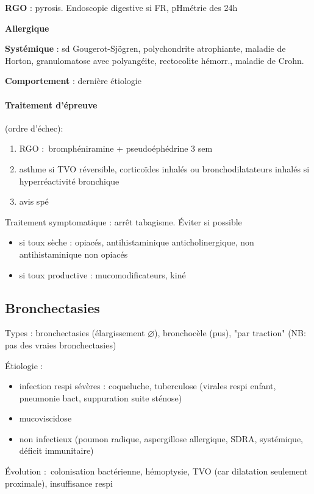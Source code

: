 \documentclass{article}
\begin{document}
\textbf{RGO} : pyrosis. Endoscopie digestive si FR, pHmétrie des 24h

\textbf{Allergique} 

\textbf{Systémique} : sd Gougerot-Sjögren, polychondrite atrophiante, maladie
de Horton, granulomatose avec polyangéite, rectocolite hémorr., maladie de
Crohn.

\textbf{Comportement} : dernière étiologie

\paragraph{Traitement d'épreuve} (ordre d'échec):
\begin{enumerate}
\item RGO : bromphéniramine + pseudoéphédrine 3 sem
\item asthme si TVO réversible, corticoïdes inhalés ou bronchodilatateurs inhalés si
  hyperréactivité bronchique
\item avis spé
\end{enumerate}

Traitement symptomatique : arrêt tabagisme. Éviter si possible
\begin{itemize}
\item si toux sèche : opiacés, antihistaminique anticholinergique, non
  antihistaminique non opiacés
\item si toux productive : mucomodificateurs, kiné
\end{itemize}

\subsection{Bronchectasies}
\label{sub:bronchectasies}
Types : bronchectasies (élargissement $\diameter$), bronchocèle (pus), "par
traction" (NB: pas des vraies bronchectasies)


Étiologie : 
\begin{itemize}
\item infection respi sévères : coqueluche, tuberculose (virales respi enfant,
  pneumonie bact, suppuration suite sténose)
\item mucoviscidose
\item non infectieux (poumon radique, aspergillose allergique, SDRA,
  systémique, déficit immunitaire)
\end{itemize}

Évolution : colonisation bactérienne, hémoptysie, TVO (car dilatation seulement
proximale), insuffisance respi
\end{document}
